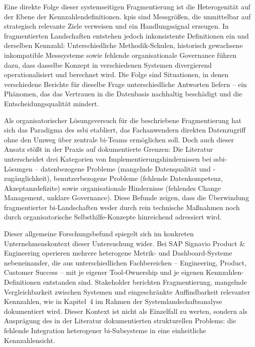 Eine direkte Folge dieser systemseitigen Fragmentierung ist die Heterogenität auf der Ebene der Kennzahlendefinitionen.
\glspl{kpi} sind Messgrößen, die unmittelbar auf strategisch relevante Ziele verweisen und ein Handlungssignal erzeugen.
In fragmentierten Landschaften entstehen jedoch inkonsistente Definitionen ein und derselben Kennzahl: Unterschiedliche Methodik-Schulen, historisch gewachsene inkompatible Messsysteme sowie fehlende organisationale Governance führen dazu, dass dasselbe Konzept in verschiedenen Systemen divergierend operationalisiert und berechnet wird.
Die Folge sind Situationen, in denen verschiedene Berichte für dieselbe Frage unterschiedliche Antworten liefern -- ein Phänomen, das das Vertrauen in die Datenbasis nachhaltig beschädigt und die Entscheidungsqualität mindert.

Als organisatorischer Lösungsversuch für die beschriebene Fragmentierung hat sich das Paradigma des \gls{ssbi} etabliert, das Fachanwendern direkten Datenzugriff ohne den Umweg über zentrale \gls{bi}-Teams ermöglichen soll.
Doch auch dieser Ansatz stößt in der Praxis auf dokumentierte Grenzen: Die Literatur unterscheidet drei Kategorien von Implementierungshindernissen bei \gls{ssbi}-Lösungen -- datenbezogene Probleme (mangelnde Datenqualität und -zugänglichkeit), benutzerbezogene Probleme (fehlende Datenkompetenz, Akzeptanzdefizite) sowie organisationale Hindernisse (fehlendes Change Management, unklare Governance).
Diese Befunde zeigen, dass die Überwindung fragmentierter \gls{bi}-Landschaften weder durch rein technische Maßnahmen noch durch organisatorische Selbsthilfe-Konzepte hinreichend adressiert wird.

Dieser allgemeine Forschungsbefund spiegelt sich im konkreten Unternehmenskontext dieser Untersuchung wider.
Bei SAP Signavio Product \& Engineering operieren mehrere heterogene Metrik- und Dashboard-Systeme nebeneinander, die aus unterschiedlichen Fachbereichen -- Engineering, Product, Customer Success -- mit je eigener Tool-Ownership und je eigenen Kennzahlen-Definitionen entstanden sind.
Stakeholder berichten Fragmentierung, mangelnde Vergleichbarkeit zwischen Systemen und eingeschränkte Auffindbarkeit relevanter Kennzahlen, wie in Kapitel~4 im Rahmen der Systemlandschaftsanalyse dokumentiert wird.
Dieser Kontext ist nicht als Einzelfall zu werten, sondern als Ausprägung des in der Literatur dokumentierten strukturellen Problems: die fehlende Integration heterogener \gls{bi}-Subsysteme in eine einheitliche Kennzahlensicht.

